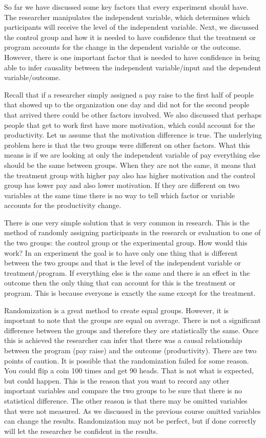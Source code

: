 \documentclass[]{book}
\theoremstyle{definition}
\theoremstyle{definition}
\theoremstyle{definition}
\theoremstyle{remark}
\begin{document}
So far we have discussed some key factors that every experiment should
have. The researcher manipulates the independent variable, which
determines which participants will receive the level of the independent
variable. Next, we discussed the control group and how it is needed to
have confidence that the treatment or program accounts for the change in
the dependent variable or the outcome. However, there is one important
factor that is needed to have confidence in being able to infer
causality between the independent variable/input and the dependent
variable/outcome.

Recall that if a researcher simply assigned a pay raise to the first
half of people that showed up to the organization one day and did not
for the second people that arrived there could be other factors
involved. We also discussed that perhaps people that get to work first
have more motivation, which could account for the productivity. Let us
assume that the motivation difference is true. The underlying problem
here is that the two groups were different on other factors. What this
means is if we are looking at only the independent variable of pay
everything else should be the same between groups. When they are not the
same, it means that the treatment group with higher pay also has higher
motivation and the control group has lower pay and also lower
motivation. If they are different on two variables at the same time
there is no way to tell which factor or variable accounts for the
productivity change.

There is one very simple solution that is very common in research. This
is the method of randomly assigning participants in the research or
evaluation to one of the two groups: the control group or the
experimental group. How would this work? In an experiment the goal is to
have only one thing that is different between the two groups and that is
the level of the independent variable or treatment/program. If
everything else is the same and there is an effect in the outcome then
the only thing that can account for this is the treatment or program.
This is because everyone is exactly the same except for the treatment.

Randomization is a great method to create equal groups. However, it is
important to note that the groups are equal on average. There is not a
significant difference between the groups and therefore they are
statistically the same. Once this is achieved the researcher can infer
that there was a causal relationship between the program (pay raise) and
the outcome (productivity). There are two points of caution. It is
possible that the randomization failed for some reason. You could flip a
coin 100 times and get 90 heads. That is not what is expected, but could
happen. This is the reason that you want to record any other important
variables and compare the two groups to be sure that there is no
statistical difference. The other reason is that there may be omitted
variables that were not measured. As we discussed in the previous course
omitted variables can change the results. Randomization may not be
perfect, but if done correctly will let the researcher be confident in
the results.
\end{document}

